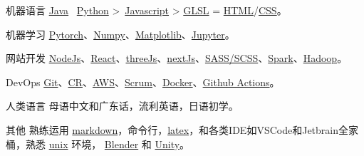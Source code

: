 
\begin{cvskills}

  \cvskill
    {机器语言}
    {\href{https://www.java.com/en/}{Java} \approx\, \href{https://www.python.org/}{Python} >\, \href{https://www.javascript.com/}{Javascript} > \href{https://www.khronos.org/opengl/wiki/OpenGL_Shading_Language}{GLSL} = \href{https://developer.mozilla.org/en-US/docs/Glossary/HTML5}{HTML}/\href{https://developer.mozilla.org/en-US/docs/Web/CSS}{CSS}。}

  \cvskill
    {机器学习} %
    {\href{https://pytorch.org/}{Pytorch}、\href{https://numpy.org/}{Numpy}、\href{https://matplotlib.org/}{Matplotlib}、\href{https://jupyter.org/}{Jupyter}。}  %

  \cvskill
    {网站开发} %
    {\href{https://nodejs.org/en/}{NodeJs}、\href{https://reactjs.org/}{React}、\href{https://threejs.org/}{threeJs}、\href{https://nextjs.org/}{nextJs}、\href{https://sass-lang.com/}{SASS/SCSS}、\href{https://spark.apache.org/}{Spark}、\href{https://hadoop.apache.org/}{Hadoop}。}
 
  \cvskill
    {DevOps} %
    {\href{https://git-scm.com/}{Git}、\href{https://en.wikipedia.org/wiki/Code_review}{CR}、\href{https://aws.amazon.com/}{AWS}、\href{https://www.scrum.org/resources/what-is-scrum}{Scrum}、\href{https://www.docker.com/}{Docker}、\href{https://github.com/features/actions}{Github Actions}。}
  
  \cvskill
    {人类语言}
    {母语中文和广东话，流利英语，日语初学。}

  \cvskill
    {其他} %
    {熟练运用 \href{https://en.wikipedia.org/wiki/Markdown}{markdown}，命令行，\href{https://www.latex-project.org/}{latex}，和各类IDE如VSCode和Jetbrain全家桶，熟悉 \href{https://en.wikipedia.org/wiki/Unix}{unix} 环境， \href{https://www.blender.org/}{Blender} 和 \href{https://unity.com/}{Unity}。}

\end{cvskills}
